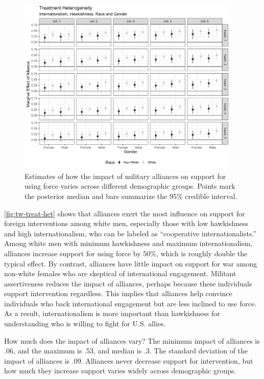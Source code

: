\documentclass[12pt]{article}
\begin{document}
\begin{figure}[htpb]
	\centering
		\includegraphics[width=0.95\textwidth]{../figures/tw-treat-het.png}
	\caption{Estimates of how the impact of military alliances on support for using force varies across different demographic groups. Points mark the posterior median and bars summarize the 95\% credible interval.}
	\label{fig:tw-treat-het}
\end{figure}


\autoref{fig:tw-treat-het} shows that alliances exert the most influence on support for foreign interventions among white men, especially those with low hawkishness and high internationalism, who can be labeled as ``cooperative internationalists.'' 
Among white men with minimum hawkishness and maximum internationalism, alliances increase support for using force by 50\%, which is roughly double the typical effect. 
By contrast, alliances have little impact on support for war among non-white females who are skeptical of international engagement.
Militant assertiveness reduces the impact of alliances, perhaps because these individuals support intervention regardless. 
This implies that alliances help convince individuals who back international engagement but are less inclined to use force. 
As a result, internationalism is more important than hawkishness for understanding who is willing to fight for U.S. allies. 


How much does the impact of alliances vary?
The minimum impact of alliances is .06, and the maximum is .53, and median is .3. 
The standard deviation of the impact of alliances is .09. 
Alliances never decrease support for intervention, but how much they increase support varies widely across demographic groups. 
\end{document}
